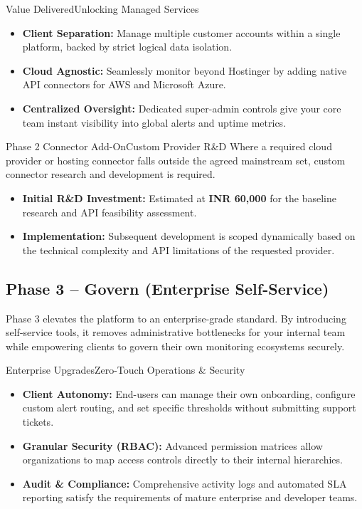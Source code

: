 \documentclass[11pt,a4paper]{article}
\begin{document}
\vspace{0.5em}
\begin{recbox}{Value Delivered}{Unlocking Managed Services}
\begin{itemize}
  \item \textbf{Client Separation:} Manage multiple customer accounts within a single platform, backed by strict logical data isolation.
  \item \textbf{Cloud Agnostic:} Seamlessly monitor beyond Hostinger by adding native API connectors for AWS and Microsoft Azure.
  \item \textbf{Centralized Oversight:} Dedicated super-admin controls give your core team instant visibility into global alerts and uptime metrics.
\end{itemize}
\end{recbox}

\vspace{0.5em}
\begin{issuebox}{Phase 2 Connector Add-On}{Custom Provider R\&D}
Where a required cloud provider or hosting connector falls outside the agreed mainstream set, custom connector research and development is required. 
\begin{itemize}
  \item \textbf{Initial R\&D Investment:} Estimated at \textbf{INR 60,000} for the baseline research and API feasibility assessment.
  \item \textbf{Implementation:} Subsequent development is scoped dynamically based on the technical complexity and API limitations of the requested provider.
\end{itemize}
\end{issuebox}
\vspace{1em}

\subsection{Phase 3 -- Govern (Enterprise Self-Service)}
Phase 3 elevates the platform to an enterprise-grade standard. By introducing self-service tools, it removes administrative bottlenecks for your internal team while empowering clients to govern their own monitoring ecosystems securely.

\vspace{0.5em}
\begin{recbox}{Enterprise Upgrades}{Zero-Touch Operations \& Security}
\begin{itemize}
  \item \textbf{Client Autonomy:} End-users can manage their own onboarding, configure custom alert routing, and set specific thresholds without submitting support tickets.
  \item \textbf{Granular Security (RBAC):} Advanced permission matrices allow organizations to map access controls directly to their internal hierarchies.
  \item \textbf{Audit \& Compliance:} Comprehensive activity logs and automated SLA reporting satisfy the requirements of mature enterprise and developer teams.
\end{itemize}
\end{recbox}
\end{document}
